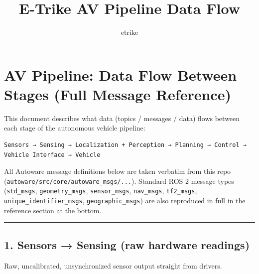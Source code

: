 \documentclass[
]{article}
\title{E-Trike AV Pipeline Data Flow}
\author{etrike}
\date{}
\begin{document}
\maketitle

\section{AV Pipeline: Data Flow Between Stages (Full Message
Reference)}\label{av-pipeline-data-flow-between-stages-full-message-reference}

This document describes what data (topics / messages / data) flows
between each stage of the autonomous vehicle pipeline:

\begin{verbatim}
Sensors → Sensing → Localization + Perception → Planning → Control → Vehicle Interface → Vehicle
\end{verbatim}

All Autoware message definitions below are taken verbatim from this repo
(\texttt{autoware/src/core/autoware\_msgs/...}). Standard ROS 2 message
types (\texttt{std\_msgs}, \texttt{geometry\_msgs},
\texttt{sensor\_msgs}, \texttt{nav\_msgs}, \texttt{tf2\_msgs},
\texttt{unique\_identifier\_msgs}, \texttt{geographic\_msgs}) are also
reproduced in full in the reference section at the bottom.

\begin{center}\rule{0.5\linewidth}{0.5pt}\end{center}

\subsection{1. Sensors → Sensing (raw hardware
readings)}\label{1-sensors--sensing-raw-hardware-readings}

Raw, uncalibrated, unsynchronized sensor output straight from drivers.
\end{document}

